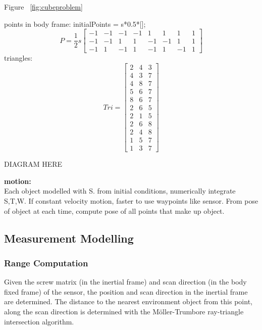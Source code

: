 Figure ~\ref{fig:cubeproblem}


points in body frame:
initialPoints = s*0.5*[];
\begin{equation}
	P = \frac{1}{2}s
	\begin{bmatrix}
		-1  &  -1  &  -1  &  -1  &   1  &   1  &   1  &  1 \\
		-1  &  -1  &   1  &   1  &  -1  &  -1  &   1  &  1 \\
		-1  &   1  &  -1  &   1  &  -1  &   1  &  -1  &  1 
	\end{bmatrix}
\end{equation}
triangles:
\begin{equation}
	Tri = 
	\begin{bmatrix}
	2 & 4 & 3 \\
    4 & 3 & 7 \\
    4 & 8 & 7 \\
    5 & 6 & 7 \\
    8 & 6 & 7 \\
    2 & 6 & 5 \\
    2 & 1 & 5 \\
    2 & 6 & 8 \\
    2 & 4 & 8 \\
    1 & 5 & 7 \\
    1 & 3 & 7
	\end{bmatrix}
\end{equation}

DIAGRAM HERE

\textbf{motion:}\\
Each object modelled with S. from initial conditions, numerically integrate S,T,W. If constant velocity motion, faster to use waypoints like sensor.
From pose of object at each time, compute pose of all points that make up object.


\subsection{Measurement Modelling}
	\subsubsection{Range Computation}
	Given the screw matrix (in the inertial frame) and scan direction (in the body fixed frame) of the sensor, the position and scan direction in the inertial frame are determined.
	The distance to the nearest environment object from this point, along the scan direction is determined with the M{\"o}ller-Trumbore ray-triangle intersection algorithm.

